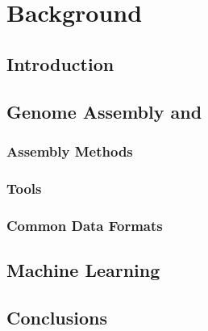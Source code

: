 \chapter{Background} \label{chap:sota}

\section*{}

\section{Introduction}

\section{Genome Assembly and \rnaseq}\label{sec:assembly}

\subsection{Assembly Methods}\label{sec:seqtools}

\subsection{\rnaseq{} Tools}\label{sec:seqtools}

\subsection{Common Data Formats}\label{sec:formats}

\section{Machine Learning}\label{sec:mlearning}

\section{Conclusions}
